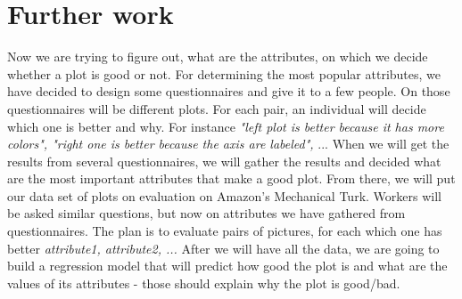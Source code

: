 \documentclass[fleqn,moreauthors,10pt]{ds_report}
\begin{document}
	\section*{Further work}
	Now we are trying to figure out, what are the attributes, on which we decide whether a plot is good or not. For determining the most popular attributes, we have decided to design some questionnaires and give it to a few people. On those questionnaires will be different plots. For each pair, an individual will decide which one is better and why. For instance \emph{"left plot is better because it has more colors", "right one is better because the axis are labeled",} ... When we will get the results from several questionnaires, we will gather the results and decided what are the most important attributes that make a good plot. From there, we will put our data set of plots on evaluation on Amazon's Mechanical Turk. Workers will be asked similar questions, but now on attributes we have gathered from questionnaires. The plan is to evaluate pairs of pictures, for each which one has better \emph{attribute1, attribute2, ...} After we will have all the data, we are going to build a regression model that will predict how good the plot is and what are the values of its attributes - those should explain why the plot is good/bad.
	
	
	
	
	
	
	
	
	
	
	
	
	
\end{document}
